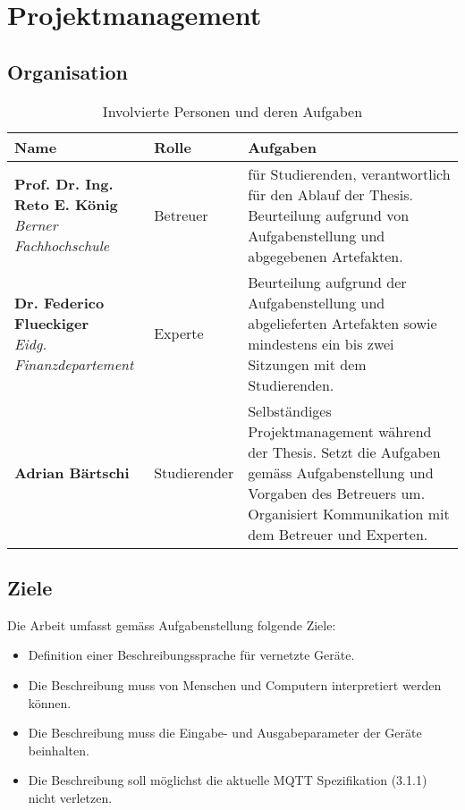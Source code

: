 \chapter{Projektmanagement}
\label{chap:projectmanagement}

\section{Organisation}

\begin{table}[H]
\begin{tabularx}{\textwidth}{|l|l|X|}

 \hline \rowcolor{lightgray}
 {\bf Name } & {\bf Rolle } & {\bf Aufgaben} \\  \hline
  \parbox[t]{5cm}{\textbf{Prof. Dr. Ing. Reto E. König} \\ \textit{Berner Fachhochschule}}  &   Betreuer  &
   für Studierenden, verantwortlich für den Ablauf der Thesis. Beurteilung aufgrund von Aufgabenstellung und abgegebenen Artefakten.   \\
 \hline
  \parbox[t]{5cm}{\textbf{Dr. Federico Flueckiger} \\ \textit{Eidg.  Finanzdepartement}} &   Experte     &
  Beurteilung aufgrund der Aufgabenstellung und abgelieferten Artefakten sowie mindestens ein bis zwei Sitzungen mit dem Studierenden. \\ 
\hline
 \textbf{Adrian Bärtschi}                &   Studierender   &     
 Selbständiges Projektmanagement während der Thesis. Setzt die Aufgaben gemäss Aufgabenstellung und Vorgaben des Betreuers um. Organisiert Kommunikation mit dem Betreuer und Experten.   \\
 \hline


\end{tabularx}
\caption{Involvierte Personen und deren Aufgaben}
\end{table}


\section{Ziele}
Die Arbeit umfasst gemäss Aufgabenstellung folgende Ziele:
\begin{itemize}
    \item Definition einer Beschreibungssprache für vernetzte Geräte.
    \item Die Beschreibung muss von Menschen und Computern interpretiert werden können.
    \item Die Beschreibung muss die Eingabe- und Ausgabeparameter der Geräte beinhalten.
    \item Die Beschreibung soll möglichst die aktuelle MQTT Spezifikation (3.1.1) nicht verletzen.
\end{itemize}

